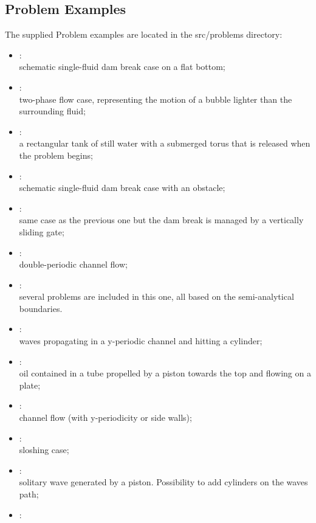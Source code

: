 \documentclass{../GPUSPHtemplate}
\begin{document}
\subsection{Problem Examples}

The supplied Problem examples are located in the src/problems directory:\\
\begin{itemize}
\item	{}:\\
schematic single-fluid dam break case on a flat bottom;
\item	{}:\\
two-phase flow case, representing the motion of a bubble lighter
than the surrounding fluid;
\item	{}:\\
a rectangular tank of still water with a submerged torus 
that is released when the problem begins;
\item	{}:\\
schematic single-fluid dam break case with an obstacle;
\item	{}:\\
same case as the previous one but the dam break is managed by a
vertically sliding gate;
\item	{}:\\
double-periodic channel flow;
\item	{}:\\
several problems are included in this one, all based on the semi-analytical boundaries.
\item	{}:\\
waves propagating in a y-periodic channel and hitting a cylinder;
\item	{}:\\
oil contained in a tube propelled by a piston towards the top and flowing on a plate;
\item	{}:\\
channel flow (with y-periodicity or side walls);
\item	{}:\\
sloshing case;
\item	{}:\\
solitary wave generated by a piston. Possibility to add cylinders on the waves path;
\item	{}:\\

\end{itemize}
\end{document}
